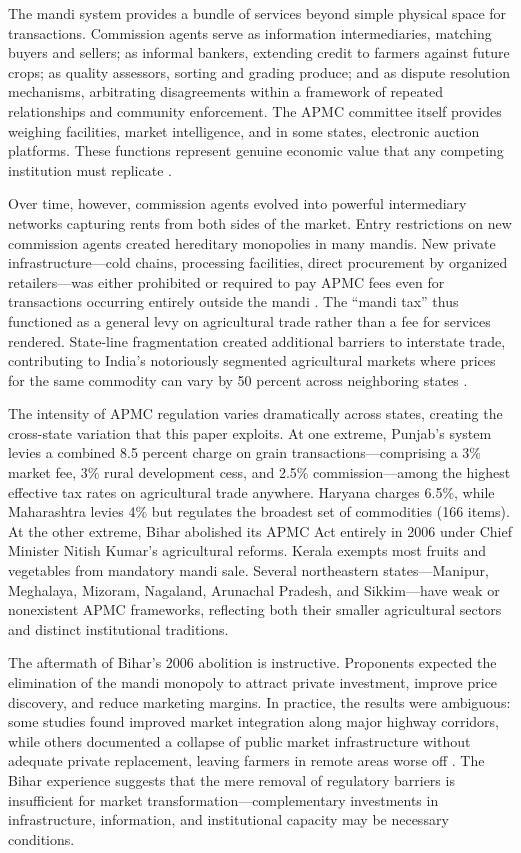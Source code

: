 \documentclass[12pt]{article}
\begin{document}
The mandi system provides a bundle of services beyond simple physical space for transactions. Commission agents serve as information intermediaries, matching buyers and sellers; as informal bankers, extending credit to farmers against future crops; as quality assessors, sorting and grading produce; and as dispute resolution mechanisms, arbitrating disagreements within a framework of repeated relationships and community enforcement. The APMC committee itself provides weighing facilities, market intelligence, and in some states, electronic auction platforms. These functions represent genuine economic value that any competing institution must replicate \citep{chand2012development}.

Over time, however, commission agents evolved into powerful intermediary networks capturing rents from both sides of the market. Entry restrictions on new commission agents created hereditary monopolies in many mandis. New private infrastructure---cold chains, processing facilities, direct procurement by organized retailers---was either prohibited or required to pay APMC fees even for transactions occurring entirely outside the mandi \citep{deboer2016regulatory, chand2015agricultural}. The ``mandi tax'' thus functioned as a general levy on agricultural trade rather than a fee for services rendered. State-line fragmentation created additional barriers to interstate trade, contributing to India's notoriously segmented agricultural markets where prices for the same commodity can vary by 50 percent across neighboring states \citep{chatterjee2020apmc}.

The intensity of APMC regulation varies dramatically across states, creating the cross-state variation that this paper exploits. At one extreme, Punjab's system levies a combined 8.5 percent charge on grain transactions---comprising a 3\% market fee, 3\% rural development cess, and 2.5\% commission---among the highest effective tax rates on agricultural trade anywhere. Haryana charges 6.5\%, while Maharashtra levies 4\% but regulates the broadest set of commodities (166 items). At the other extreme, Bihar abolished its APMC Act entirely in 2006 under Chief Minister Nitish Kumar's agricultural reforms. Kerala exempts most fruits and vegetables from mandatory mandi sale. Several northeastern states---Manipur, Meghalaya, Mizoram, Nagaland, Arunachal Pradesh, and Sikkim---have weak or nonexistent APMC frameworks, reflecting both their smaller agricultural sectors and distinct institutional traditions.

The aftermath of Bihar's 2006 abolition is instructive. Proponents expected the elimination of the mandi monopoly to attract private investment, improve price discovery, and reduce marketing margins. In practice, the results were ambiguous: some studies found improved market integration along major highway corridors, while others documented a collapse of public market infrastructure without adequate private replacement, leaving farmers in remote areas worse off \citep{chand2015agricultural}. The Bihar experience suggests that the mere removal of regulatory barriers is insufficient for market transformation---complementary investments in infrastructure, information, and institutional capacity may be necessary conditions.
\end{document}

